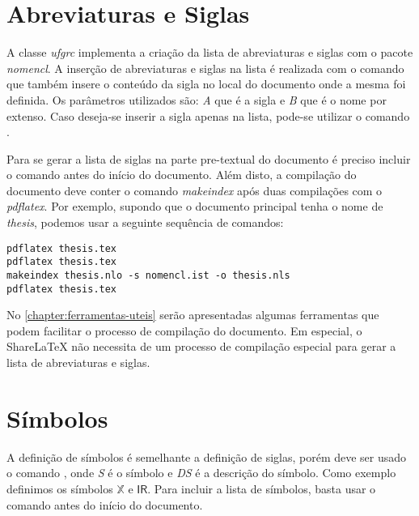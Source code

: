 \section{Abreviaturas e Siglas}

A classe \textit{ufgrc} implementa a criação da lista de abreviaturas e siglas com o pacote \textit{nomencl}. A inserção de abreviaturas e siglas na lista é realizada com o comando  que também insere o conteúdo da sigla no local do documento onde a mesma foi definida. Os parâmetros utilizados são: \textit{A} que é a sigla e \textit{B} que é o nome por extenso. Caso deseja-se inserir a sigla apenas na lista, pode-se utilizar o comando .

Para se gerar a lista de siglas na parte pre-textual do documento é preciso incluir o comando  antes do início do documento. Além disto, a compilação do documento deve conter o comando \textit{makeindex} após duas compilações com o \textit{pdflatex}. Por exemplo, supondo que o documento principal tenha o nome de \textit{thesis}, podemos usar a seguinte sequência de comandos:

\begin{verbatim}
pdflatex thesis.tex
pdflatex thesis.tex
makeindex thesis.nlo -s nomencl.ist -o thesis.nls
pdflatex thesis.tex
\end{verbatim}

No \autoref{chapter:ferramentas-uteis} serão apresentadas algumas ferramentas que podem facilitar o processo de compilação do documento. Em especial, o ShareLaTeX não necessita de um processo de compilação especial para gerar a lista de abreviaturas e siglas.


\section{Símbolos}

A definição de símbolos é semelhante a definição de siglas, porém deve ser usado o comando , onde \textit{S} é o símbolo e \textit{DS} é a descrição do símbolo. Como exemplo definimos os símbolos $\mathbb{X}$ e $\mathsf{I\!R}$. Para incluir a lista de símbolos, basta usar o comando  antes do início do documento.
